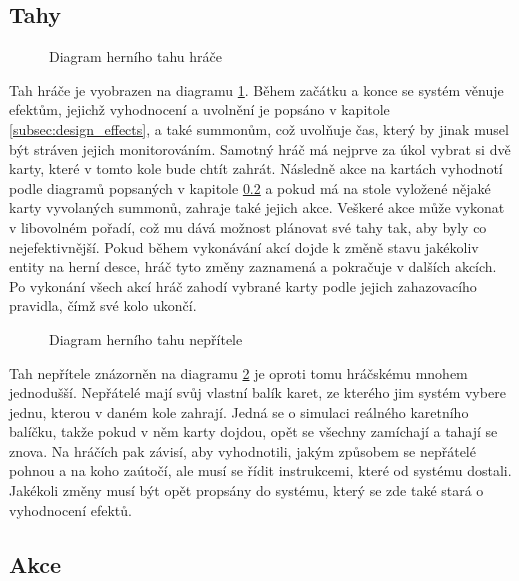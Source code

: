 \subsection{Tahy}
\label{subsec:design_turns}

\begin{figure}[h]
    \centering
    \caption{Diagram herního tahu hráče}
    \label{diag:player_turn}
\end{figure}

Tah hráče je vyobrazen na diagramu \ref{diag:player_turn}. Během začátku a konce se systém věnuje efektům, jejichž vyhodnocení a uvolnění je popsáno v kapitole \ref{subsec:design_effects}, a také summonům, což uvolňuje čas, který by jinak musel být stráven jejich monitorováním. Samotný hráč má nejprve za úkol vybrat si dvě karty, které v tomto kole bude chtít zahrát. Následně akce na kartách vyhodnotí podle diagramů popsaných v kapitole \ref{subsec:design_actions} a pokud má na stole vyložené nějaké karty vyvolaných summonů, zahraje také jejich akce. Veškeré akce může vykonat v libovolném pořadí, což mu dává možnost plánovat své tahy tak, aby byly co nejefektivnější. Pokud během vykonávání akcí dojde k změně stavu jakékoliv entity na herní desce, hráč tyto změny zaznamená a pokračuje v dalších akcích. Po vykonání všech akcí hráč zahodí vybrané karty podle jejich zahazovacího pravidla, čímž své kolo ukončí.

\begin{figure}[h]
    \centering
    \caption{Diagram herního tahu nepřítele}
    \label{diag:enemy_turn}
\end{figure}

Tah nepřítele znázorněn na diagramu \ref{diag:enemy_turn} je oproti tomu hráčskému mnohem jednodušší. Nepřátelé mají svůj vlastní balík karet, ze kterého jim systém vybere jednu, kterou v daném kole zahrají. Jedná se o simulaci reálného karetního balíčku, takže pokud v něm karty dojdou, opět se všechny zamíchají a tahají se znova. Na hráčích pak závisí, aby vyhodnotili, jakým způsobem se nepřátelé pohnou a na koho zaútočí, ale musí se řídit instrukcemi, které od systému dostali. Jakékoli změny musí být opět propsány do systému, který se zde také stará o vyhodnocení efektů.


\subsection{Akce}
\label{subsec:design_actions}

